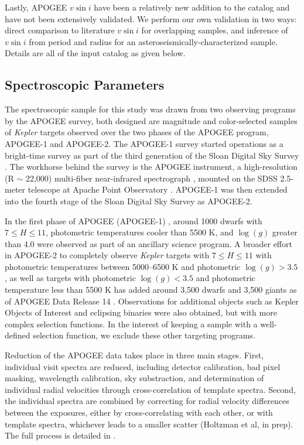 \documentclass[manuscript]{aastex6}
\newcommand{\vsini}{\ensuremath{v \sin i}}
\newcommand{\Kepler}{\mbox{\textit{Kepler}}}
\newcommand{\logg}{\ensuremath{\log(g)}}
\newcommand{\gvs}{\authorcomment1}
\begin{document}
Lastly, APOGEE \vsini{} have been a relatively new addition to the catalog and
have not been extensively validated. We perform our own validation in two ways:
direct comparison to literature \vsini{} for overlapping samples, and inference
of \vsini{} from period and radius for an asteroseismically-characterized 
sample. Details are all of the input catalog as given below.

\subsection{Spectroscopic Parameters}

The spectroscopic sample for this study was drawn from two observing programs by the APOGEE
survey, both designed are magnitude and color-selected samples of
\Kepler{} targets observed over the two phases of the APOGEE program, APOGEE-1
and APOGEE-2. The APOGEE-1 survey started operations as a bright-time
survey as part of the third generation of the Sloan Digital Sky Survey
\citep{Eisenstein11}. The workhorse behind the survey is the APOGEE instrument,
a high-resolution (R \(\sim\) 22,000) multi-fiber near-infrared spectrograph
\citep{Wilson10}, mounted on the SDSS 2.5-meter telescope at Apache Point
Observatory \citep{Gunn06}. APOGEE-1 was then extended into the fourth stage of
the Sloan Digital Sky Survey \citep{Blanton17} as APOGEE-2. \gvs{Fill in science
requirements of APOGEE-2 vs APOGEE-1}

In the first phase of APOGEE (APOGEE-1) \citep{Majewski17}, around 1000 dwarfs
with \(7 \le H \le 11\), photometric temperatures cooler than 5500 K, and
\logg{} greater than 4.0 \citep{Brown11,Pinsonneault12} were observed as part
of an ancillary science program. A broader effort in APOGEE-2 to completely observe
\Kepler{} targets with \(7 \le H \le 11\) with photometric temperatures between
5000--6500 K and photometric \(\logg > 3.5\), as well as targets with
photometric \(\logg < 3.5\) and photometric temperature less than 5500 K  
\citep{Pinsonneault12,Huber14} has added around 3,500 dwarfs and 3,500 giants 
as of APOGEE Data Release 14 \citep{Zasowski17}. Observations for additional 
objects such as Kepler Objects of Interest and eclipsing binaries were also 
obtained, but with more complex selection functions. In the interest of keeping
a sample with a well-defined selection function, we exclude these other
targeting programs.




Reduction of the APOGEE data takes place in three main stages. First,
individual visit spectra are reduced, including detector calibration, bad pixel
masking, wavelength calibration, sky substraction, and determination of
individual radial velocities through cross-correlation of template spectra.
Second, the individual spectra are combined by correcting for radial velocity
differences between the exposures, either by cross-correlating with each other,
or with template spectra, whichever leads to a smaller scatter (Holtzman et
al, in prep). The full process is detailed in \citet{Nidever15}.
\end{document}
